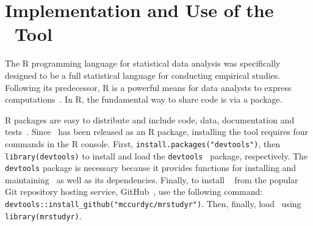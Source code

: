 \section{Implementation and Use of the \mr~Tool}

The R programming language for statistical data analysis was specifically designed to
be a full statistical language for conducting empirical studies. Following its predecessor,
R is a powerful means for data analysts to express computations~\cite{ihaka1996r}.
In R, the fundamental way to share code is via a package.


R packages are easy to distribute and include code, data, documentation and tests~\cite{wickham2015r}.  Since \mr~has
been released as an R package, installing the tool requires four commands in the R console.  First,
\texttt{install.packages("devtools")}, then {\small\texttt{library(devtools)}} to install and load the
{\small\texttt{devtools}}~\cite{devtools} package, respectively.  The \texttt{devtools} package is necessary because it
provides functions for installing and maintaining \mr~as well as its dependencies.  Finally, to install \mr~\cite{tool}
from the popular Git repository hosting service, GitHub~\cite{github}, use the following command:
{\small\texttt{devtools::install\_github("mccurdyc/mrstudyr")}}.  Then, finally, load \mr~using
\texttt{library(mrstudyr)}.




